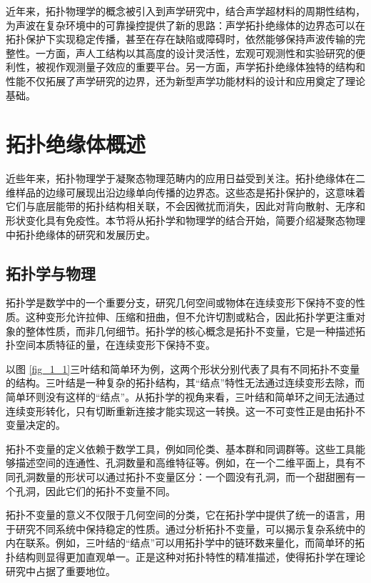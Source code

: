 近年来，拓扑物理学的概念被引入到声学研究中，结合声学超材料的周期性结构，为声波在复杂环境中的可靠操控提供了新的思路：声学拓扑绝缘体的边界态可以在拓扑保护下实现稳定传播，甚至在存在缺陷或障碍时，依然能够保持声波传输的完整性。一方面，声人工结构以其高度的设计灵活性，宏观可观测性和实验研究的便利性，被视作观测量子效应的重要平台。另一方面，声学拓扑绝缘体独特的结构和性能不仅拓展了声学研究的边界，还为新型声学功能材料的设计和应用奠定了理论基础。


\section{拓扑绝缘体概述}

近些年来，拓扑物理学于凝聚态物理范畴内的应用日益受到关注。拓扑绝缘体在二维样品的边缘可展现出沿边缘单向传播的边界态。这些态是拓扑保护的，这意味着它们与底层能带的拓扑结构相关联，不会因微扰而消失，因此对背向散射、无序和形状变化具有免疫性。本节将从拓扑学和物理学的结合开始，简要介绍凝聚态物理中拓扑绝缘体的研究和发展历史。

\subsection{拓扑学与物理}
拓扑学是数学中的一个重要分支，研究几何空间或物体在连续变形下保持不变的性质\cite{d1}。这种变形允许拉伸、压缩和扭曲，但不允许切割或粘合，因此拓扑学更注重对象的整体性质，而非几何细节。拓扑学的核心概念是拓扑不变量，它是一种描述拓扑空间本质特征的量，在连续变形下保持不变。

以图 \ref{fig_1_1}三叶结和简单环为例，这两个形状分别代表了具有不同拓扑不变量的结构。三叶结是一种复杂的拓扑结构，其“结点”特性无法通过连续变形去除，而简单环则没有这样的“结点”。从拓扑学的视角来看，三叶结和简单环之间无法通过连续变形转化，只有切断重新连接才能实现这一转换。这一不可变性正是由拓扑不变量决定的。

拓扑不变量的定义依赖于数学工具，例如同伦类、基本群和同调群等。这些工具能够描述空间的连通性、孔洞数量和高维特征等。例如，在一个二维平面上，具有不同孔洞数量的形状可以通过拓扑不变量区分：一个圆没有孔洞，而一个甜甜圈有一个孔洞，因此它们的拓扑不变量不同。

拓扑不变量的意义不仅限于几何空间的分类，它在拓扑学中提供了统一的语言，用于研究不同系统中保持稳定的性质。通过分析拓扑不变量，可以揭示复杂系统中的内在联系。例如，三叶结的“结点”可以用拓扑学中的链环数来量化，而简单环的拓扑结构则显得更加直观单一。正是这种对拓扑特性的精准描述，使得拓扑学在理论研究中占据了重要地位。

